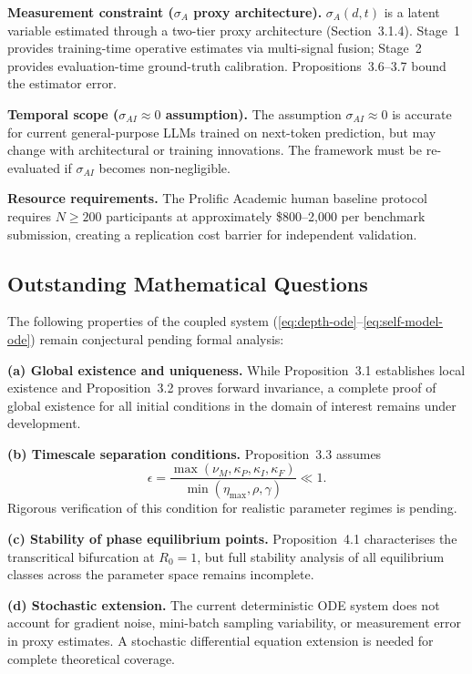 \documentclass[11pt,a4paper]{article}
\begin{document}
\textbf{Measurement constraint ($\sigma_A$ proxy architecture).}
$\sigma_A(d,t)$ is a latent variable estimated through a two-tier proxy
architecture (Section~3.1.4). Stage~1 provides training-time operative
estimates via multi-signal fusion; Stage~2 provides evaluation-time
ground-truth calibration. Propositions~3.6--3.7 bound the estimator error.

\textbf{Temporal scope ($\sigma_{AI} \approx 0$ assumption).}
The assumption $\sigma_{AI} \approx 0$ is accurate for current
general-purpose LLMs trained on next-token prediction, but may change
with architectural or training innovations. The framework must be
re-evaluated if $\sigma_{AI}$ becomes non-negligible.

\textbf{Resource requirements.} The Prolific Academic human baseline
protocol requires $N \geq 200$ participants at approximately
\$800--2,000 per benchmark submission, creating a replication cost
barrier for independent validation.

\subsection{Outstanding Mathematical Questions}\label{sec:open-questions}

The following properties of the coupled system (\eqref{eq:depth-ode}--\eqref{eq:self-model-ode})
remain conjectural pending formal analysis:

\textbf{(a) Global existence and uniqueness.} While Proposition~3.1
establishes local existence and Proposition~3.2 proves forward invariance,
a complete proof of global existence for all initial conditions in the
domain of interest remains under development.

\textbf{(b) Timescale separation conditions.} Proposition~3.3 assumes
\begin{equation*}
\epsilon = \frac{\max(\nu_M, \kappa_P, \kappa_I, \kappa_F)}{\min(\eta_{\max}, \rho, \gamma)} \ll 1.
\end{equation*}
Rigorous verification of this condition for realistic parameter regimes
is pending.

\textbf{(c) Stability of phase equilibrium points.} Proposition~4.1
characterises the transcritical bifurcation at $R_0 = 1$, but full
stability analysis of all equilibrium classes across the parameter space
remains incomplete.

\textbf{(d) Stochastic extension.} The current deterministic ODE system
does not account for gradient noise, mini-batch sampling variability,
or measurement error in proxy estimates. A stochastic differential
equation extension is needed for complete theoretical coverage.
\end{document}
